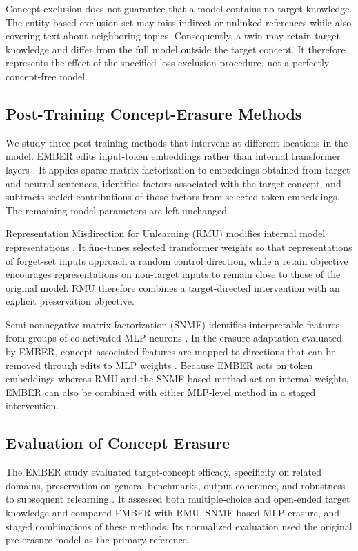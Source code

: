 Concept exclusion does not guarantee that a model contains no target
knowledge. The entity-based exclusion set may miss indirect or unlinked
references while also covering text about neighboring topics. Consequently,
a twin may retain target knowledge and differ from the full model outside the
target concept. It therefore represents the effect of the specified
loss-exclusion procedure, not a perfectly concept-free model.

\subsection{Post-Training Concept-Erasure Methods}

We study three post-training methods that intervene at different locations in
the model. EMBER edits input-token embeddings rather than internal transformer
layers \citep{suslik2026ember}. It applies sparse matrix factorization to
embeddings obtained from target and neutral sentences, identifies factors
associated with the target concept, and subtracts scaled contributions of
those factors from selected token embeddings. The remaining model parameters
are left unchanged.

Representation Misdirection for Unlearning (RMU) modifies internal model
representations \citep{li2024wmdp}. It fine-tunes selected transformer weights
so that representations of forget-set inputs approach a random control
direction, while a retain objective encourages representations on non-target
inputs to remain close to those of the original model. RMU therefore combines
a target-directed intervention with an explicit preservation objective.

Semi-nonnegative matrix factorization (SNMF) identifies interpretable features
from groups of co-activated MLP neurons \citep{shafran2026snmf}. In the
erasure adaptation evaluated by EMBER, concept-associated features are mapped
to directions that can be removed through edits to MLP weights
\citep{suslik2026ember}. Because EMBER acts on token embeddings whereas RMU
and the SNMF-based method act on internal weights, EMBER can also be combined
with either MLP-level method in a staged intervention.

\subsection{Evaluation of Concept Erasure}

The EMBER study evaluated target-concept efficacy, specificity on related
domains, preservation on general benchmarks, output coherence, and robustness
to subsequent relearning \citep{suslik2026ember}. It assessed both
multiple-choice and open-ended target knowledge and compared EMBER with RMU,
SNMF-based MLP erasure, and staged combinations of these methods. Its
normalized evaluation used the original pre-erasure model as the primary
reference.

